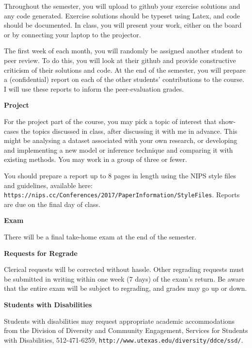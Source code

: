 \documentclass[11pt]{article}
\begin{document}
Throughout the semester, you will upload to github your exercise solutions and any code generated. Exercise solutions should be typeset using Latex, and code should be documented. In class, you will present your work, either on the board or by connecting your laptop to the projector.

The first week of each month, you will randomly be assigned another student to peer review. To do this, you will look at their github and provide constructive criticism of their solutions and code. At the end of the semester, you will prepare a (confidential) report on each of the other students' contributions to the course. I will use these reports to inform the peer-evaluation grades.


\textbf{Project}

For the project part of the course, you may pick a topic of interest that show-cases the topics discussed in class, after discussing it with me in advance. This might be analysing a dataset associated with your own research, or developing and implementing a new model or inference technique and comparing it with existing methods. You may work in a group of three or fewer. 

You should prepare a report up to 8 pages in length using the NIPS style files and guidelines, available here: \texttt{https://nips.cc/Conferences/2017/PaperInformation/StyleFiles}. Reports are due on the final day of class.





\textbf{Exam}

There will be a final take-home exam at the end of the semester.



\vspace{5mm}

\textbf {\large Requests for Regrade}

Clerical requests will be corrected without hassle. Other regrading requests must be submitted in writing within one week (7 days) of the exam's return. Be aware that the entire exam will be subject to regrading, and grades may go up or down.




\vspace{5mm}

\textbf{\large Students with Disabilities }

Students with disabilities may request appropriate academic accommodations from the Division of Diversity and Community Engagement, Services for Students with Disabilities, 512-471-6259, \texttt{http://www.utexas.edu/diversity/ddce/ssd/}.
\end{document}
